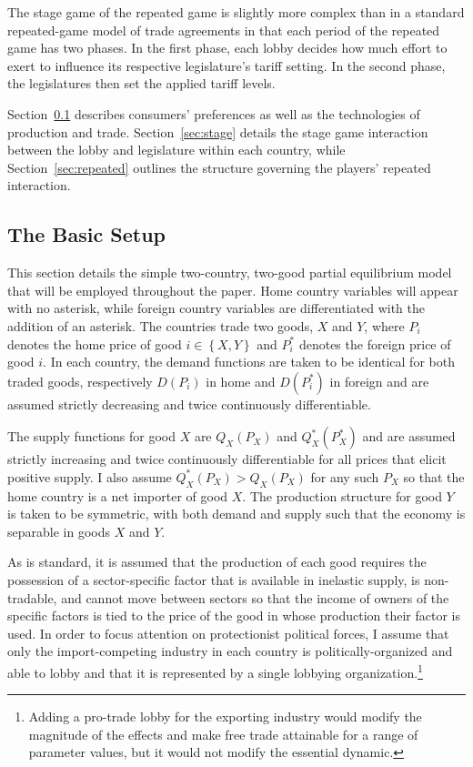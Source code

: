 \documentclass[authoryear, review]{elsarticle}
\begin{document}
The stage game of the repeated game is slightly more complex than in a standard repeated-game model of trade agreements in that each period of the repeated game has two phases. In the first phase, each lobby decides how much effort to exert to influence its respective legislature's tariff setting. In the second phase, the legislatures then set the applied tariff levels.

Section~\ref{sec:basic} describes consumers' preferences as well as the technologies of production and trade. Section~\ref{sec:stage} details the stage game interaction between the lobby and legislature within each country, while Section~\ref{sec:repeated} outlines the structure governing the players' repeated interaction.


\subsection{The Basic Setup}
\label{sec:basic}
This section details the simple two-country, two-good partial equilibrium model that will be employed throughout the paper. Home country variables will appear with no asterisk, while foreign country variables are differentiated with the addition of an asterisk. The countries trade two goods, $X$ and $Y$, where $P_i$ denotes the home price of good $i \in \left\{X,Y\right\}$ and $P_i^*$ denotes the foreign price of good $i$. In each country, the demand functions are taken to be identical for both traded goods, respectively $D(P_i)$ in home and $D(P_i^*)$ in foreign and are assumed strictly decreasing and twice continuously differentiable.

The supply functions for good $X$ are $Q_X(P_X)$ and $Q_X^*(P_X^*)$ and are assumed strictly increasing and twice continuously differentiable for all prices that elicit positive supply. I also assume $Q_X^*(P_X) > Q_X(P_X)$ for any such $P_X$ so that the home country is a net importer of good $X$. The production structure for good $Y$ is taken to be symmetric, with both demand and supply such that the economy is separable in goods $X$ and $Y$.

As is standard, it is assumed that the production of each good requires the possession of a sector-specific factor that is available in inelastic supply, is non-tradable, and cannot move between sectors so that the income of owners of the specific factors is tied to the price of the good in whose production their factor is used. In order to focus attention on protectionist political forces, I assume that only the import-competing industry in each country is politically-organized and able to lobby and that it is represented by a single lobbying organization.\footnote{Adding a pro-trade lobby for the exporting industry would modify the magnitude of the effects and make free trade attainable for a range of parameter values, but it would not modify the essential dynamic.}
\end{document}
